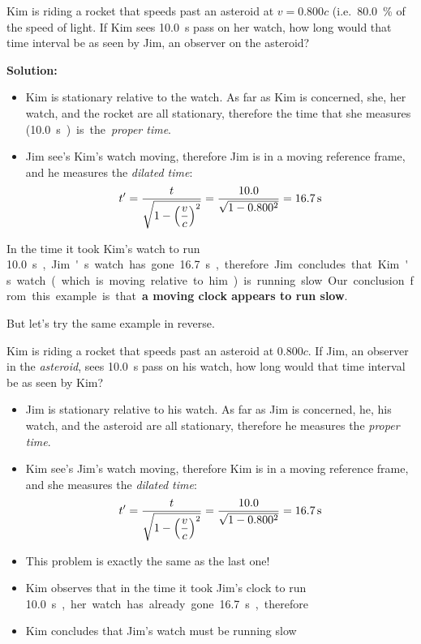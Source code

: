 \begin{example}
  \label{example:time1}
  Kim is riding a rocket that speeds past an asteroid at $v=0.800c$ (i.e.\
  \SI{80.0}{\percent} of the speed of light. If Kim sees \SI{10.0}{\second}
  pass on her watch, how long would that time interval be as seen by Jim, an
  observer on the asteroid?
  
  \textbf{Solution:}
  \begin{itemize}[leftmargin=15pt]
  \item Kim is stationary relative to the watch. As far as Kim is concerned,
    she, her watch, and the rocket are all stationary, therefore the time that
    she measures (\SI{10.0}\second) is the \emph{proper time}.
  \item Jim see's Kim's watch moving, therefore Jim is in a moving reference
    frame, and he measures the \emph{dilated time}:
    \begin{displaymath}
      t' =\frac t{\sqrt{1-\left(\dfrac vc\right)^2}}=\frac{10.0}{\sqrt{1-0.800^2}}=\SI{16.7}\second
    \end{displaymath}
  \end{itemize}
  In the time it took Kim's watch to run \SI{10.0}\second, Jim's watch has gone
  \SI{16.7}\second, therefore Jim concludes that Kim's watch (which is moving
  relative to him) is running slow. Our conclusion from this example is that
  \textbf{a moving clock appears to run slow}.
\end{example}
But let's try the same example in reverse.
\begin{example}
  Kim is riding a rocket that speeds past an asteroid at $0.800c$. If Jim, an
  observer in the \emph{asteroid}, sees \SI{10.0}{\second} pass on his watch,
  how long would that time interval be as seen by Kim?
  \begin{itemize}
  \item Jim is stationary relative to his watch. As far as Jim is concerned,
    he, his watch, and the asteroid are all stationary, therefore he measures
    the \emph{proper time}.
  \item Kim see's Jim's watch moving, therefore Kim is in a moving reference
    frame, and she measures the \emph{dilated time}:
    \begin{displaymath}
      t' =\frac t{\sqrt{1-\left(\dfrac vc\right)^2}}=\frac{10.0}{\sqrt{1-0.800^2}}=\SI{16.7}\second
    \end{displaymath}
  \item This problem is exactly the same as the last one!
  \item Kim observes that in the time it took Jim's clock to run
    \SI{10.0}\second, her watch has already gone \SI{16.7}\second, therefore
  \item Kim concludes that Jim's watch must be running slow
  \end{itemize}
\end{example}

